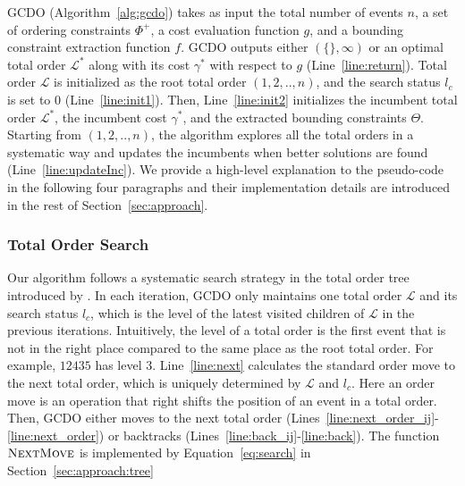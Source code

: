 \documentclass[letterpaper]{article} %
\theoremstyle{definition}
\newcommand{\LE}{\mathcal{L}}
\begin{document}
GCDO (Algorithm~\ref{alg:gcdo}) takes as input the total number of events $n$, a set of ordering constraints $\Phi^+$, a cost evaluation function $g$, and a bounding constraint extraction function $f$. GCDO outputs either $(\{\}, \infty)$ or an optimal total order $\LE^*$ along with its cost $\gamma^*$ with respect to  $g$ (Line~\ref{line:return}). Total order $\LE$ is initialized as the root total order $(1,2,..,n)$, and the search status $l_c$ is set to $0$ (Line~\ref{line:init1}). Then, Line~\ref{line:init2} initializes the incumbent total order $\LE^*$, the incumbent cost $\gamma^*$, and the extracted bounding constraints $\Theta$. Starting from $(1,2,..,n)$, the algorithm explores all the total orders in a systematic way and updates the incumbents when better solutions are found (Line~\ref{line:updateInc}). We provide a high-level explanation to the pseudo-code in the following four paragraphs and their implementation details are introduced in the rest of Section~\ref{sec:approach}.

\subsubsection{Total Order Search} Our algorithm follows a systematic search strategy in the total order tree introduced by \cite{ono2005constant}. In each iteration, GCDO only maintains one total order $\LE$ and its search status $l_c$,  which is the level of the latest visited children of $\LE$ in the previous iterations. Intuitively, the level of a total order is the first event that is not in the right place compared to the same place as the root total order. For example, $12435$ has level $3$. Line~\ref{line:next} calculates the standard order move to the next total order, which is uniquely determined by $\LE$ and $l_c$. Here an order move is an operation that right shifts the position of an event in a total order. %
Then, GCDO either moves to the next total order (Lines~\ref{line:next_order_ij}-\ref{line:next_order}) or backtracks (Lines~\ref{line:back_ij}-\ref{line:back}). The function $\textsc{NextMove}$ is implemented by Equation~\ref{eq:search} in Section~\ref{sec:approach:tree} 
\end{document}
